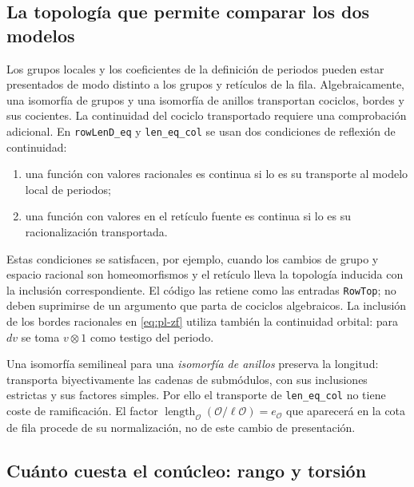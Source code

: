 \subsection{La topología que permite comparar los dos modelos}
\label{subsec:pl-topologia}

Los grupos locales y los coeficientes de la definición de periodos
pueden estar presentados de modo distinto a los grupos y retículos
de la fila. Algebraicamente, una isomorfía de grupos y una
isomorfía de anillos transportan cociclos, bordes y sus cocientes.
La continuidad del cociclo transportado requiere una comprobación
adicional. En \texttt{rowLenD\_eq} y \texttt{len\_eq\_col} se
usan dos condiciones de reflexión de continuidad:

\begin{enumerate}
\item una función con valores racionales es continua si lo es su
      transporte al modelo local de periodos;
\item una función con valores en el retículo fuente es continua
      si lo es su racionalización transportada.
\end{enumerate}

Estas condiciones se satisfacen, por ejemplo, cuando los cambios
de grupo y espacio racional son homeomorfismos y el retículo
lleva la topología inducida con la inclusión correspondiente.
El código las retiene como las entradas \texttt{RowTop}; no deben
suprimirse de un argumento que parta de cociclos algebraicos.
La inclusión de los bordes racionales en \eqref{eq:pl-zf} utiliza
también la continuidad orbital: para $dv$ se toma $v\otimes1$
como testigo del periodo.

Una isomorfía semilineal para una \emph{isomorfía de anillos}
preserva la longitud: transporta biyectivamente las cadenas de
submódulos, con sus inclusiones estrictas y sus factores simples.
Por ello el transporte de \texttt{len\_eq\_col} no tiene coste
de ramificación. El factor
$\operatorname{length}_{\mathcal O}(\mathcal O/\ell\mathcal O)
=e_{\mathcal O}$ que aparecerá en la cota de fila procede de su
normalización, no de este cambio de presentación.

\subsection{Cuánto cuesta el conúcleo: rango y torsión}
\label{subsec:pl-coste}


